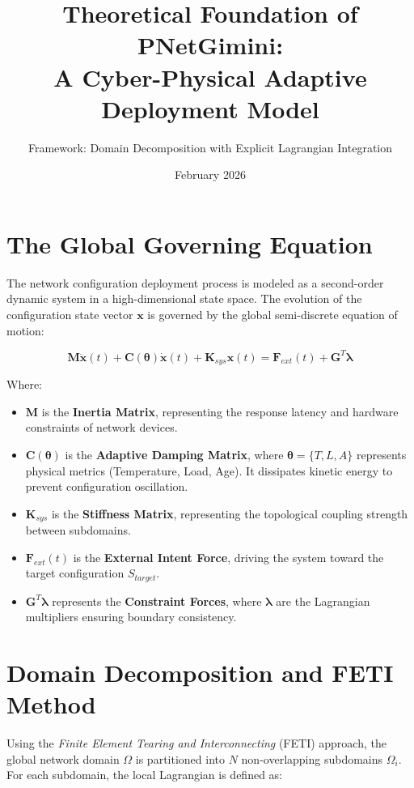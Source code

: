 \documentclass{article}
\title{Theoretical Foundation of PNetGimini: \\ A Cyber-Physical Adaptive Deployment Model}
\author{Framework: Domain Decomposition with Explicit Lagrangian Integration}
\date{February 2026}
\begin{document}
\maketitle

\section{The Global Governing Equation}
The network configuration deployment process is modeled as a second-order dynamic system in a high-dimensional state space. The evolution of the configuration state vector $\mathbf{x}$ is governed by the global semi-discrete equation of motion:

\begin{equation}
\mathbf{M}\ddot{\mathbf{x}}(t) + \mathbf{C}(\bm{\theta})\dot{\mathbf{x}}(t) + \mathbf{K}_{sys}\mathbf{x}(t) = \mathbf{F}_{ext}(t) + \mathbf{G}^T \bm{\lambda}
\end{equation}

Where:
\begin{itemize}
    \item $\mathbf{M}$ is the \textbf{Inertia Matrix}, representing the response latency and hardware constraints of network devices.
    \item $\mathbf{C}(\bm{\theta})$ is the \textbf{Adaptive Damping Matrix}, where $\bm{\theta} = \{T, L, A\}$ represents physical metrics (Temperature, Load, Age). It dissipates kinetic energy to prevent configuration oscillation.
    \item $\mathbf{K}_{sys}$ is the \textbf{Stiffness Matrix}, representing the topological coupling strength between subdomains.
    \item $\mathbf{F}_{ext}(t)$ is the \textbf{External Intent Force}, driving the system toward the target configuration $S_{target}$.
    \item $\mathbf{G}^T \bm{\lambda}$ represents the \textbf{Constraint Forces}, where $\bm{\lambda}$ are the Lagrangian multipliers ensuring boundary consistency.
\end{itemize}

\section{Domain Decomposition and FETI Method}
Using the \textit{Finite Element Tearing and Interconnecting} (FETI) approach, the global network domain $\Omega$ is partitioned into $N$ non-overlapping subdomains $\Omega_i$. For each subdomain, the local Lagrangian is defined as:
\end{document}
